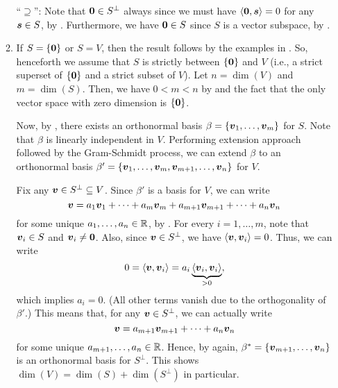 \begin{enumerate}
\begin{pf}
\begin{enumerate}
``\(\supseteq\)'': Note that \(\vb*{0}\in S^{\perp}\) always since we must
have \(\left\langle \vb*{0},\vb*{s}\right\rangle=0\) for any \(\vb*{s}\in S\), by
. Furthermore, we have \(\vb*{0}\in S\) since \(S\) is
a vector subspace, by .

\item If \(S=\{\vb*{0}\}\) or \(S=V\), then the result follows by the examples
in . So, henceforth we assume that \(S\) is
strictly between \(\{\vb*{0}\}\) and \(V\) (i.e., a strict superset of
\(\{\vb*{0}\}\) and a strict subset of \(V\)). Let \(n=\dim(V)\) and
\(m=\dim(S)\). Then, we have \(0<m<n\) by
 and the fact that the only vector
space with zero dimension is \(\{\vb*{0}\}\).

Now, by , there exists an
orthonormal basis \(\beta=\{\vb*{v}_1,\dotsc,\vb*{v}_m\}\) for \(S\). Note
that \(\beta\) is linearly independent in \(V\). Performing extension approach
followed by the Gram-Schmidt process, we can extend \(\beta\) to an orthonormal
basis
\(\beta'=\{\vb*{v}_1,\dotsc,\vb*{v}_m,\vb*{v}_{m+1},\dotsc,\vb*{v}_n\}\)
for \(V\).

Fix any \(\vb*{v}\in S^{\perp}\subseteq V\). Since \(\beta'\) is a basis for
\(V\), we can write
\[
\vb*{v}=a_1\vb*{v}_1+\dotsb+a_m\vb*{v}_m+a_{m+1}\vb*{v}_{m+1}+\dotsb+a_n\vb*{v}_n
\]
for some unique \(a_1,\dotsc,a_n\in\mathbb{R}\), by .
For every \(i=1,\dotsc,m\), note that \(\vb*{v}_i\in S\) and
\(\vb*{v}_i\ne\vb*{0}\). Also, since \(\vb*{v}\in S^{\perp}\), we have
\(\left\langle \vb*{v},\vb*{v}_i\right\rangle=0\). Thus, we can write
\[
0=\left\langle \vb*{v},\vb*{v}_i\right\rangle=a_i\underbrace{\left\langle \vb*{v}_i,\vb*{v}_i\right\rangle}_{>0},
\]
which implies \(a_i=0\). (All other terms vanish due to the orthogonality of
\(\beta'\).) This means that, for any \(\vb*{v}\in S^{\perp}\), we can
actually write
\[
\vb*{v}=a_{m+1}\vb*{v}_{m+1}+\dotsb+a_n\vb*{v}_n
\]
for some unique \(a_{m+1},\dotsc,a_n\in\mathbb{R}\). Hence, by
 again,
\(\beta^*=\{\vb*{v}_{m+1},\dotsc,\vb*{v}_n\}\) is an orthonormal basis for
\(S^{\perp}\). This shows \(\dim(V)=\dim(S)+\dim(S^{\perp})\) in particular.


\end{enumerate}
\end{pf}
\end{enumerate}

